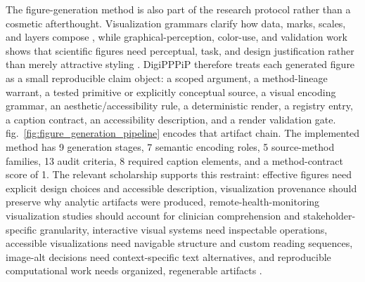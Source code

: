 \documentclass[
  english,
]{article}
\begin{document}
The figure-generation method is also part of the research protocol
rather than a cosmetic afterthought. Visualization grammars clarify how
data, marks, scales, and layers compose
\citep{wilkinson2005grammar, wickham2010layered, bostock2011d3, satyanarayan2017vegalite},
while graphical-perception, color-use, and validation work shows that
scientific figures need perceptual, task, and design justification
rather than merely attractive styling
\citep{cleveland1984graphical, munzner2009nested, crameri2020colour}.
DigiPPPiP therefore treats each generated figure as a small reproducible
claim object: a scoped argument, a method-lineage warrant, a tested
primitive or explicitly conceptual source, a visual encoding grammar, an
aesthetic/accessibility rule, a deterministic render, a registry entry,
a caption contract, an accessibility description, and a render
validation gate. fig.~\ref{fig:figure_generation_pipeline} encodes that
artifact chain. The implemented method has 9 generation stages, 7
semantic encoding roles, 5 source-method families, 13 audit criteria, 8
required caption elements, and a method-contract score of 1. The
relevant scholarship supports this restraint: effective figures need
explicit design choices and accessible description, visualization
provenance should preserve why analytic artifacts were produced,
remote-health-monitoring visualization studies should account for
clinician comprehension and stakeholder-specific granularity,
interactive visual systems need inspectable operations, accessible
visualizations need navigable structure and custom reading sequences,
image-alt decisions need context-specific text alternatives, and
reproducible computational work needs organized, regenerable artifacts
\citep{kelleher2011guidelines, rougier2014figures, ragan2016provenance, lebaron2025remoteviz, heer2012interactive, elavsky2024datanavigator, jones2024customization, w3c2024altdecisiontree, wilson2017goodenough, rule2019jupyter, stodden2014reproducible, lundgard2022accessible}.
\end{document}
